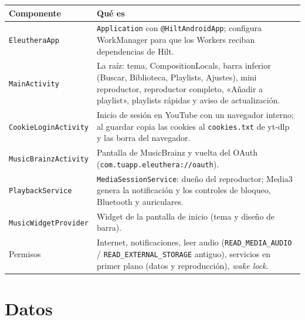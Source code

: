 \documentclass[11pt,a4paper,oneside]{report}
\newcommand{\cod}[1]{\texttt{\small #1}}
\newenvironment{dosCol}[2]{%
  \small
  \begin{longtable}{>{\raggedright\arraybackslash}p{5.3cm} >{\raggedright\arraybackslash}p{10.6cm}}
  \toprule
  \textbf{#1} & \textbf{#2} \\ \midrule \endhead
  \bottomrule \endfoot
}{\end{longtable}}
\begin{document}
\begin{dosCol}{Componente}{Qué es}
  \cod{EleutheraApp} & \cod{Application} con \cod{@HiltAndroidApp}; configura WorkManager
    para que los Workers reciban dependencias de Hilt. \\
  \cod{MainActivity} & La raíz: tema, CompositionLocals, barra inferior (Buscar, Biblioteca,
    Playlists, Ajustes), mini reproductor, reproductor completo, «Añadir a playlist», playlists
    rápidas y aviso de actualización. \\
  \cod{CookieLoginActivity} & Inicio de sesión en YouTube con un navegador interno; al guardar
    copia las cookies al \cod{cookies.txt} de yt-dlp y las borra del navegador. \\
  \cod{MusicBrainzActivity} & Pantalla de MusicBrainz y vuelta del OAuth
    (\cod{com.tuapp.eleuthera://oauth}). \\
  \cod{PlaybackService} & \cod{MediaSessionService}: dueño del reproductor; Media3 genera la
    notificación y los controles de bloqueo, Bluetooth y auriculares. \\
  \cod{MusicWidgetProvider} & Widget de la pantalla de inicio (tema y diseño de barra). \\
  Permisos & Internet, notificaciones, leer audio (\cod{READ\_MEDIA\_AUDIO} /
    \cod{READ\_EXTERNAL\_STORAGE} antiguo), servicios en primer plano (datos y reproducción),
    \emph{wake lock}. \\
\end{dosCol}

\section{Datos}
\end{document}
